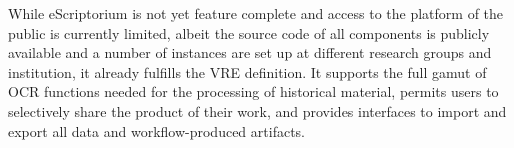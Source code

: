 While eScriptorium is not yet feature complete and access to the platform of
the public is currently limited, albeit the source code of all components is
publicly available and a number of instances are set up at different research
groups and institution, it already fulfills the VRE definition. It supports the
full gamut of OCR functions needed for the processing of historical material,
permits users to selectively share the product of their work, and provides
interfaces to import and export all data and workflow-produced artifacts.
